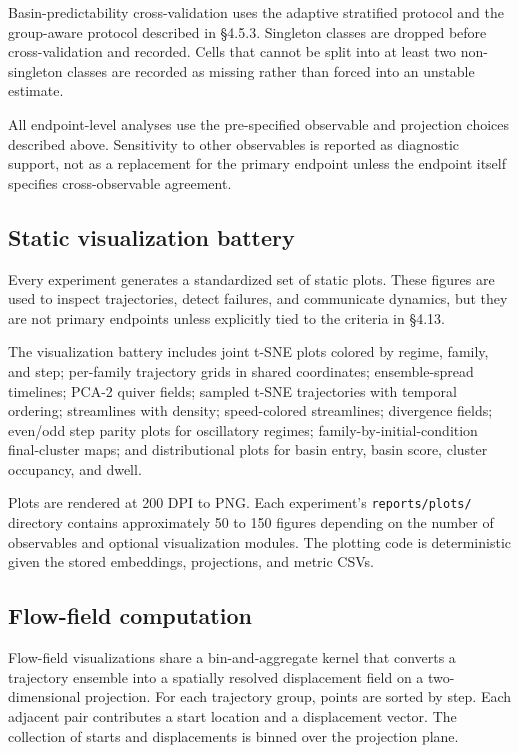 \documentclass{article}
\theoremstyle{plain}
\theoremstyle{definition}
\begin{document}
Basin-predictability cross-validation uses the adaptive stratified protocol and the group-aware protocol described in §4.5.3. Singleton classes are dropped before cross-validation and recorded. Cells that cannot be split into at least two non-singleton classes are recorded as missing rather than forced into an unstable estimate.

All endpoint-level analyses use the pre-specified observable and projection choices described above. Sensitivity to other observables is reported as diagnostic support, not as a replacement for the primary endpoint unless the endpoint itself specifies cross-observable agreement.

\subsection{Static visualization battery}

Every experiment generates a standardized set of static plots. These figures are used to inspect trajectories, detect failures, and communicate dynamics, but they are not primary endpoints unless explicitly tied to the criteria in §4.13.

The visualization battery includes joint t-SNE plots colored by regime, family, and step; per-family trajectory grids in shared coordinates; ensemble-spread timelines; PCA-2 quiver fields; sampled t-SNE trajectories with temporal ordering; streamlines with density; speed-colored streamlines; divergence fields; even/odd step parity plots for oscillatory regimes; family-by-initial-condition final-cluster maps; and distributional plots for basin entry, basin score, cluster occupancy, and dwell.

Plots are rendered at 200 DPI to PNG. Each experiment's \texttt{reports/plots/} directory contains approximately 50 to 150 figures depending on the number of observables and optional visualization modules. The plotting code is deterministic given the stored embeddings, projections, and metric CSVs.

\subsection{Flow-field computation}

Flow-field visualizations share a bin-and-aggregate kernel that converts a trajectory ensemble into a spatially resolved displacement field on a two-dimensional projection. For each trajectory group, points are sorted by step. Each adjacent pair contributes a start location and a displacement vector. The collection of starts and displacements is binned over the projection plane.
\end{document}
